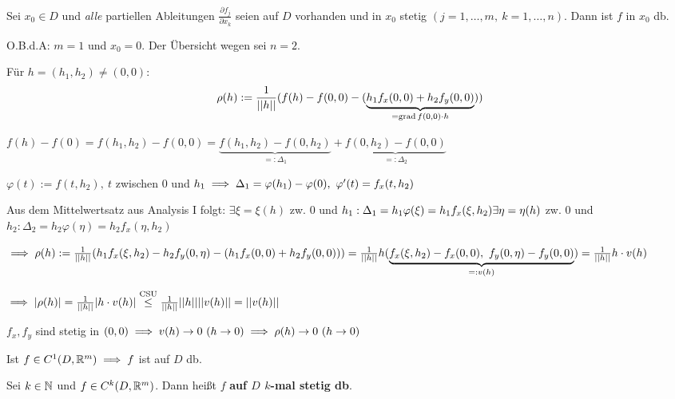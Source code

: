 \documentclass[a4paper,twoside,DIV15,BCOR12mm,chapterprefix=true,headings=twolinechapter]{scrbook}
\begin{document}
\begin{satz}
Sei $x_0 \in D$ und \emph{alle} partiellen Ableitungen $\frac{\partial f_j}{\partial x_k}$ seien auf $D$ vorhanden und in $x_0$ stetig $(j=1,\ldots,m,\ k=1,\ldots,n)$. Dann ist $f$ in $x_0$ db.
\end{satz}

\begin{beweis}
O.B.d.A: $m=1$ und $x_0=0$. Der Übersicht wegen sei $n=2$.

Für $h = (h_1,h_2) \ne (0,0):$ $$\rho(h) := \frac{1}{||h||}(f(h) - f(0,0) - (\underbrace{h_1 f_x(0,0) + h_2 f_y(0,0)}_{= \mathop{\rm grad}\nolimits f(0,0)\cdot h}))$$

$f(h) - f(0) = f(h_1,h_2) - f(0,0) = \underbrace{f(h_1,h_2) - f(0,h_2)}_{=:\Delta_1} + \underbrace{f(0,h_2) - f(0,0)}_{=:\Delta_2}$

$\varphi(t) := f(t,h_2),\ t$ zwischen $0$ und $h_1 \implies \Delta_1 = \varphi(h_1) - \varphi(0),\ \varphi'(t) = f_x(t,h_2)$

Aus dem Mittelwertsatz aus Analysis I folgt:
$\exists \xi = \xi(h)$ zw. $0$ und $h_1: \Delta_1 = h_1\varphi(\xi) = h_1 f_x(\xi,h_2)\\
\exists \eta = \eta(h)$ zw. $0$ und $h_2: \Delta_2 = h_2\varphi(\eta) = h_2 f_x(\eta,h_2)$

$\implies \rho(h) := \frac{1}{||h||}(h_1 f_x(\xi,h_2) - h_2 f_y(0,\eta) - (h_1 f_x(0,0) + h_2 f_y(0,0)))\\
= \frac{1}{||h||} h(\underbrace{f_x(\xi,h_2) - f_x(0,0),\ f_y(0,\eta) - f_y(0,0)}_{=:v(h)})
= \frac{1}{||h||} h\cdot v(h)$

$\implies |\rho(h)| = \frac{1}{||h||} |h\cdot v(h)| \overset{\text{CSU}}{\le} \frac{1}{||h||} ||h|| ||v(h)|| = ||v(h)||$

$f_x,f_y$ sind stetig in $(0,0) \implies v(h) \to 0\ (h \to 0) \implies \rho(h) \to 0\ (h \to 0)$
\end{beweis}

\begin{folgerung}
Ist $f \in C^1(D,\mathbb{R}^m) \implies f$ ist auf $D$ db.
\end{folgerung}

\begin{definition*}
Sei $k \in \mathbb{N}$ und $f \in C^k(D,\mathbb{R}^m)$. Dann heißt $f$ \textbf{auf $D$ $k$-mal stetig db}.
\end{definition*}
\end{document}
